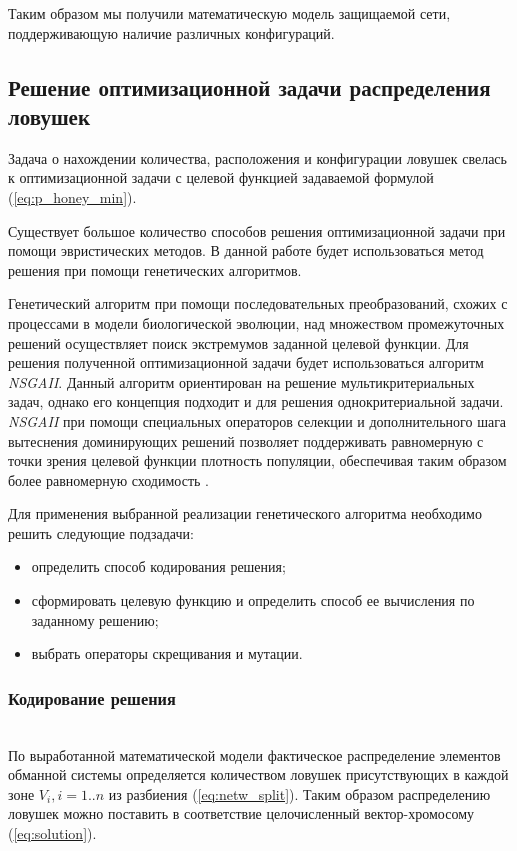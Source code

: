 Таким образом мы получили математическую модель защищаемой сети, поддерживающую наличие различных конфигураций.

\subsection{Решение оптимизационной задачи распределения ловушек}

Задача о нахождении количества, расположения и конфигурации ловушек свелась к оптимизационной задачи с целевой функцией задаваемой формулой (\ref{eq:p_honey_min}).

Существует большое количество способов решения оптимизационной задачи при помощи эвристических методов. В данной работе будет использоваться метод решения при помощи генетических алгоритмов.

Генетический алгоритм при помощи последовательных преобразований, схожих с процессами в модели биологической эволюции, над множеством промежуточных решений осуществляет поиск экстремумов заданной целевой функции. Для решения полученной оптимизационной задачи будет использоваться алгоритм \textit{NSGAII}. Данный алгоритм ориентирован на решение мультикритериальных задач, однако его концепция подходит и для решения однокритериальной задачи. \textit{NSGAII} при помощи специальных операторов селекции и дополнительного шага вытеснения доминирующих решений позволяет поддерживать равномерную с точки зрения целевой функции плотность популяции, обеспечивая таким образом более равномерную сходимость \citep{NSGA2002}.

Для применения выбранной реализации генетического алгоритма необходимо решить следующие подзадачи:
\begin{itemize}
	\item определить способ кодирования решения;
	\item сформировать целевую функцию и определить способ ее вычисления по заданному решению;
	\item выбрать операторы скрещивания и мутации.
\end{itemize}

\subsubsection{Кодирование решения}\hspace*{\fill} \\

По выработанной математической модели фактическое распределение элементов обманной системы определяется количеством ловушек присутствующих в каждой зоне $V_i, i=1..n$ из разбиения (\ref{eq:netw_split}). Таким образом распределению ловушек можно поставить в соответствие целочисленный вектор-хромосому (\ref{eq:solution}).

